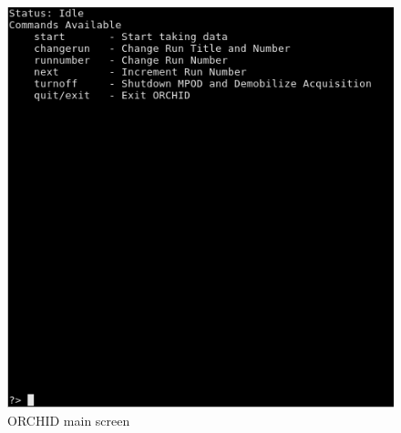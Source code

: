 \documentclass[onecolumn, 10pt, letterpaper, twoside]{article}
\begin{document}
\begin{figure}[h!]
\begin{center}
\includegraphics[width=\textwidth]{./Main_Menu.png}
\caption{ORCHID main screen}
\label{fig:ORCHID_Main}
\end{center}
\end{figure}
\end{document}
